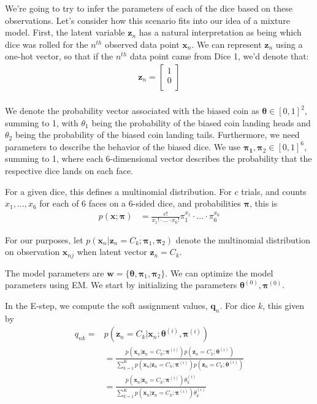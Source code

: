\documentclass[12pt,letterpaper]{article}
\begin{document}
We're going to try to infer the parameters of each of the dice based on these observations.
%
Let's consider how this scenario fits into our idea of a mixture model. First, the latent variable $\textbf{z}_n$ has a natural interpretation as being which dice was rolled for the $n^{th}$ observed data point $\textbf{x}_n$. We can represent $\textbf{z}_n$ using a one-hot vector, so that if the $n^{th}$ data point came from Dice 1, we'd denote that:
\begin{align*}
    \textbf{z}_n =
        \begin{bmatrix}
            1 \\
            0 \\
        \end{bmatrix} \\
\end{align*}

We denote the probability vector associated with the biased coin as $\boldsymbol{\theta} \in [0,1]^{2}$, summing to 1, with $\theta_1$ being the probability of the biased coin landing heads and $\theta_2$ being the probability of the biased coin landing tails. Furthermore, we need parameters to describe the behavior of the biased dice. We use $\boldsymbol{\pi_1}, \boldsymbol{\pi}_2 \in [0,1]^{6}$, summing to 1, where each 6-dimensional vector describes the probability that the respective dice lands on each face.

For a given dice, this defines a multinomial distribution. For $c$ trials, and counts $x_1, \ldots, x_6$ for each of 6 faces on a 6-sided dice, and probabilities $\boldsymbol{\pi}$, this is
%
\begin{align}
  p(\mathbf{x}; \boldsymbol{\pi})&=\frac{c!}{x_1!\cdot \ldots \cdot x_6!}\pi_1^{x_1}\cdot \ldots \cdot \pi_6^{x_6}
\end{align}

For our purposes, let $ p(\textbf{x}_n | \textbf{z}_n = C_k; \boldsymbol{\pi}_1, \boldsymbol{\pi}_2)$ denote the
multinomial distribution on observation $\textbf{x}_{nj}$ when latent vector $\textbf{z}_n = C_k$.

%
%
The model parameters are $\textbf{w} = \{\boldsymbol{\theta}, \boldsymbol{\pi}_1, \boldsymbol{\pi}_2 \}$.
We can optimize the model parameters using EM. We start by initializing the parameters $\boldsymbol{\theta}^{(0)}, \boldsymbol{\pi}^{(0)}$.

In the E-step, we compute the soft assignment values, $\textbf{q}_n$. For dice $k$, this given by
%
\begin{align} \label{E-for-multinomial}
q_{nk} = 
&  p(\textbf{z}_n = C_k | \textbf{x}_n; \boldsymbol{\theta}^{(i)}, \boldsymbol{\pi}^{(i)})
\\
&  =
     \frac{  p(\textbf{x}_n | \textbf{z}_n = C_k; \boldsymbol{\pi}^{(i)})p(\textbf{z}_n = C_k; \boldsymbol{\theta}^{(i)})}
     {\sum_{k=1}^K  p(\textbf{x}_n | \textbf{z}_n = C_k; \boldsymbol{\pi}^{(i)})p(\textbf{z}_n = C_k; \boldsymbol{\theta}^{(i)})}
  \\
  &  =
     \frac{  p(\textbf{x}_n | \textbf{z}_n = C_k; \boldsymbol{\pi}^{(i)})\theta_k^{(i)}}
     {\sum_{k=1}^K  p(\textbf{x}_n | \textbf{z}_n = C_k; \boldsymbol{\pi}^{(i)})\theta_k^{(i)}}
\end{align}
\end{document}
